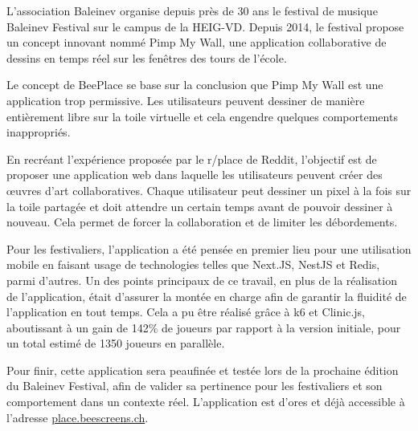 L'association Baleinev organise depuis près de 30 ans le festival de musique Baleinev Festival sur le campus de la HEIG-VD. Depuis 2014, le festival propose un concept innovant nommé Pimp My Wall, une application collaborative de dessins en temps réel sur les fenêtres des tours de l'école.

Le concept de BeePlace se base sur la conclusion que Pimp My Wall est une application trop permissive. Les utilisateurs peuvent dessiner de manière entièrement libre sur la toile virtuelle et cela engendre quelques comportements inappropriés.

En recréant l'expérience proposée par le r/place de Reddit, l'objectif est de proposer une application web dans laquelle les utilisateurs peuvent créer des œuvres d'art collaboratives. Chaque utilisateur peut dessiner un pixel à la fois sur la toile partagée et doit attendre un certain temps avant de pouvoir dessiner à nouveau. Cela permet de forcer la collaboration et de limiter les débordements.

Pour les festivaliers, l'application a été pensée en premier lieu pour une utilisation mobile en faisant usage de technologies telles que Next.JS, NestJS et Redis, parmi d'autres.
Un des points principaux de ce travail, en plus de la réalisation de l'application, était d'assurer la montée en charge afin de garantir la fluidité de l'application en tout temps. Cela a pu être réalisé grâce à k6 et Clinic.js, aboutissant à un gain de 142\% de joueurs par rapport à la version initiale, pour un total estimé de 1350 joueurs en parallèle.

Pour finir, cette application sera peaufinée et testée lors de la prochaine édition du Baleinev Festival, afin de valider sa pertinence pour les festivaliers et son comportement dans un contexte réel. L'application est d'ores et déjà accessible à l'adresse \href{https://place.beescreens.ch}{place.beescreens.ch}.
